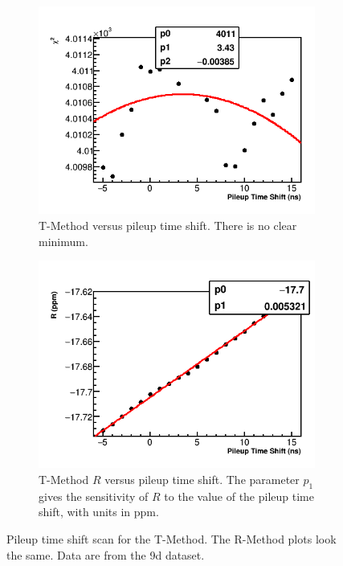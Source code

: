 \begin{figure}[h]
\centering
    \begin{subfigure}[t]{0.45\textwidth}
        \centering
        \includegraphics[width=\textwidth]{TMethod_Chi2_Vs_PileupTimeShift_Canv}
        \caption{T-Method \chisq versus pileup time shift. There is no clear minimum.}
    \end{subfigure}%
    \hspace{1cm}
    \begin{subfigure}[t]{0.45\textwidth}
        \centering
        \includegraphics[width=\textwidth]{TMethod_R_Vs_PileupTimeShift_Canv}
        \caption{T-Method $R$ versus pileup time shift. The parameter $p_{1}$ gives the sensitivity of $R$ to the value of the pileup time shift, with units in ppm.}
    \end{subfigure}
\caption[Pileup time shift scan]{Pileup time shift scan for the T-Method. The R-Method plots look the same. Data are from the 9d dataset.}
\label{fig:PTSscan}
\end{figure}


